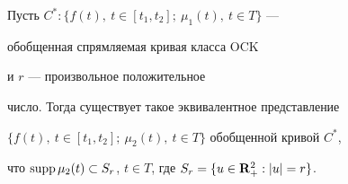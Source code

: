 \begin{lem}


Пусть $C^*:\{f(t),\ t\in[t_1,t_2];\ \mu_1(t),\ t\in T\}$ ---


обобщенная спрямляемая кривая класса $\mathrm{OCK}$


и $r$ --- произвольное положительное


число. Тогда существует такое эквивалентное представление


$\{f(t),\ t\in[t_1,t_2];\ \mu_2(t),\ t\in T\}$ обобщенной кривой $C^*$,


что $\supp\mu_2(t) \subset S_r$, $t\in T$, где $S_r=\{u\in {\bold R}^2_+


:|u|=r\}$.


\end{lem}





